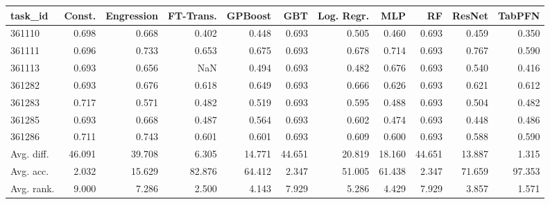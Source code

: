 \begin{tabular}{lrrrrrrrrrr}
\toprule
task\_id & Const. & Engression & FT-Trans. & GPBoost & GBT & Log. Regr. & MLP & RF & ResNet & TabPFN \\
\midrule
361110 & 0.698 & 0.668 & 0.402 & 0.448 & 0.693 & 0.505 & 0.460 & 0.693 & 0.459 & 0.350 \\
361111 & 0.696 & 0.733 & 0.653 & 0.675 & 0.693 & 0.678 & 0.714 & 0.693 & 0.767 & 0.590 \\
361113 & 0.693 & 0.656 & NaN & 0.494 & 0.693 & 0.482 & 0.676 & 0.693 & 0.540 & 0.416 \\
361282 & 0.693 & 0.676 & 0.618 & 0.649 & 0.693 & 0.666 & 0.626 & 0.693 & 0.621 & 0.612 \\
361283 & 0.717 & 0.571 & 0.482 & 0.519 & 0.693 & 0.595 & 0.488 & 0.693 & 0.504 & 0.482 \\
361285 & 0.693 & 0.668 & 0.487 & 0.564 & 0.693 & 0.602 & 0.474 & 0.693 & 0.448 & 0.486 \\
361286 & 0.711 & 0.743 & 0.601 & 0.601 & 0.693 & 0.609 & 0.600 & 0.693 & 0.588 & 0.590 \\
Avg. diff. & 46.091 & 39.708 & 6.305 & 14.771 & 44.651 & 20.819 & 18.160 & 44.651 & 13.887 & 1.315 \\
Avg. acc. & 2.032 & 15.629 & 82.876 & 64.412 & 2.347 & 51.005 & 61.438 & 2.347 & 71.659 & 97.353 \\
Avg. rank. & 9.000 & 7.286 & 2.500 & 4.143 & 7.929 & 5.286 & 4.429 & 7.929 & 3.857 & 1.571 \\
\bottomrule
\end{tabular}
